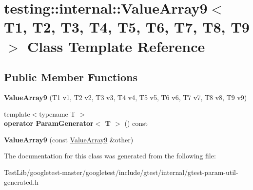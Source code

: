 \hypertarget{classtesting_1_1internal_1_1ValueArray9}{}\section{testing\+:\+:internal\+:\+:Value\+Array9$<$ T1, T2, T3, T4, T5, T6, T7, T8, T9 $>$ Class Template Reference}
\label{classtesting_1_1internal_1_1ValueArray9}
\subsection*{Public Member Functions}
\begin{DoxyCompactItemize}
\item 
\mbox{\label{classtesting_1_1internal_1_1ValueArray9_a4985545b509dc5d7db659cd31b110c21}} 
{\bfseries Value\+Array9} (T1 v1, T2 v2, T3 v3, T4 v4, T5 v5, T6 v6, T7 v7, T8 v8, T9 v9)
\item 
\mbox{\label{classtesting_1_1internal_1_1ValueArray9_aede7e5849cfab0504c49673d5c5c4cce}} 
{\footnotesize template$<$typename T $>$ }\\{\bfseries operator Param\+Generator$<$ T $>$} () const
\item 
\mbox{\label{classtesting_1_1internal_1_1ValueArray9_ab251d9c7a0df5c8034ecda38eadd030a}} 
{\bfseries Value\+Array9} (const \hyperlink{classtesting_1_1internal_1_1ValueArray9}{Value\+Array9} \&other)
\end{DoxyCompactItemize}


The documentation for this class was generated from the following file\+:\begin{DoxyCompactItemize}
\item 
Test\+Lib/googletest-\/master/googletest/include/gtest/internal/gtest-\/param-\/util-\/generated.\+h\end{DoxyCompactItemize}
